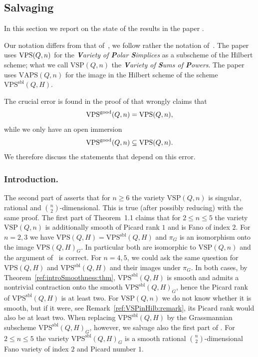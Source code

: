 \documentclass{amsart}
\newcommand{\VPSsbl}{{\mathrm{VPS}}^{\mathrm{sbl}}(Q, H)}
\newcommand{\VPS}{\mathrm{VPS}(Q, H)}
\newcommand{\VAPS}{\mathrm{VAPS}(Q, n)}
\newcommand{\VSPn}{\mathrm{VSP}(Q, n)}
\newenvironment{customthm}[1]
  {\renewcommand\theinnercustomthm{#1}\innercustomthm}
  {\endinnercustomthm}
\begin{document}
\subsection{Salvaging \cite{RS}}
In this section we report on the state of the results in the paper \cite{RS}.

Our notation differs from that of~\cite{RS}, we follow rather the notation
of~\cite{ranestad_schreyer_VSP}.
The paper~\cite{RS} uses ${\rm VPS}(Q,n)$ for the \emph{\textbf{V}ariety of
\textbf{P}olar \textbf{S}implices} as a subscheme of the Hilbert scheme;
what we call $\VSPn$ the \emph{\textbf{V}ariety of \textbf{S}ums of
\textbf{P}owers}. The
paper~\cite{RS} uses $\VAPS$ for the image in the Hilbert scheme of the scheme $\VPSsbl$. 

The crucial error is found in the proof of \cite[Corollary 2.2]{RS} that wrongly
claims that $${\rm VPS}^{\rm good}(Q,n) = {\rm VPS}(Q,n),$$ while we only have an open immersion $${\rm VPS}^{\rm good}(Q,n) \subseteq {\rm VPS}(Q,n).$$
We therefore discuss the statements that depend on this error.


\subsubsection{Introduction.} The second part of \cite[Theorem~1.1]{RS} asserts
that for $n\geq 6$ the variety $\VSPn$ is
singular, rational and $\binom{n}{2}$-dimensional. This is true (after
possibly reducing) with the same proof. The first part of Theorem~1.1 claims
that for $2\leq n\leq 5$ the variety $\VSPn$ is additionally smooth of Picard
rank $1$ and is Fano of index $2$. For $n=2,3$ we have $\VPS=\VPSsbl$ and $\pi_G$ is an isomorphism onto the image $\VPS_G$.  In particular both are isomorphic to $\VSPn$ and
the argument of~\cite{RS} is correct.
For $n=4,5$, we could ask the same question for $\VPS$ and $\VPSsbl$ and their images under $\pi_G$.
In both cases, by Theorem~\ref{ref:introSmoothness:thm}, $\VPSsbl$ 
is smooth and admits a nontrivial contraction onto the smooth $\VPSsbl_G$, hence the
Picard rank of $\VPSsbl$ is at least two. For $\VSPn$ we do not know whether it is smooth,
but if it were,
see
Remark~\ref{ref:VSPinHilb:remark}, its Picard rank would also be at least two.
When replacing $\VPSsbl$ by the Grassmannian subscheme $\VPSsbl_G$, however, we salvage also the first part of \cite[Theorem~1.1]{RS}.
\begin{customthm}{1.1}[{Corollary~\ref{ref:Fano:cor}}]
    For $2\leq n\leq 5$ the variety $\VPSsbl_G$ is a smooth rational
    $\binom{n}{2}$-dimensional Fano variety of index $2$ and Picard number
    $1$.
\end{customthm}
\end{document}

